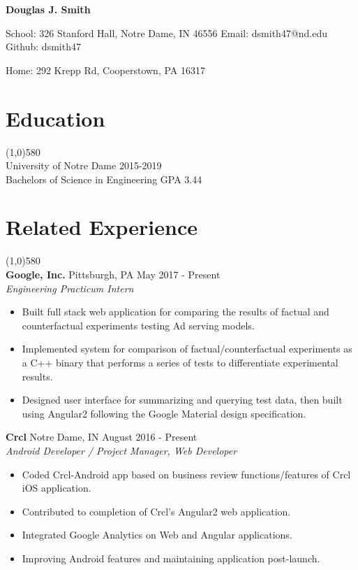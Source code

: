 \documentclass[9pt]{article}
\begin{document}
  \centerline{
    \LARGE\textbf{Douglas J. Smith}
  }
  \centerline{
    School: 326 Stanford Hall, Notre Dame, IN 46556
    Email: dsmith47@nd.edu
    Github: dsmith47
  }
  \centerline{
    Home: 292 Krepp Rd, Cooperstown, PA 16317
  }

  \vspace{-16pt}
  \section*{Education}
    \vspace{-16pt}
    \line(1,0){580}\\
    University of Notre Dame
    \hfill
    2015-2019
    \\
    Bachelors of Science in Engineering
    \hfill
    GPA 3.44
    \\
  \vspace{-28pt}
  \section*{Related Experience}
    \vspace{-16pt}
    \line(1,0){580}\\
    \textbf{Google, Inc.}
    \hfill
    Pittsburgh, PA
    \hfill
    May 2017 - Present
    \\
    \textit{Engineering Practicum Intern}
    \begin{itemize}
      \item Built full stack web application for comparing the results of factual and counterfactual experiments testing Ad serving models.
      \item Implemented system for comparison of factual/counterfactual experiments as a C++ binary that performs a series of tests to differentiate experimental results.
      \item Designed user interface for summarizing and querying test data, then built using Angular2 following the Google Material design specification.
    \end{itemize}
  
    \textbf{Crcl}
    \hfill
    Notre Dame, IN
    \hfill
    August 2016 - Present
    \\
    \textit{Android Developer / Project Manager, Web Developer}
    \begin{itemize}
      \item Coded Crcl-Android app based on business review functions/features of Crcl iOS application.
      \item Contributed to completion of Crcl's Angular2 web application.
      \item Integrated Google Analytics on Web and Angular applications.
      \item Improving Android features and maintaining application post-launch.
    \end{itemize}
    
\end{document}
